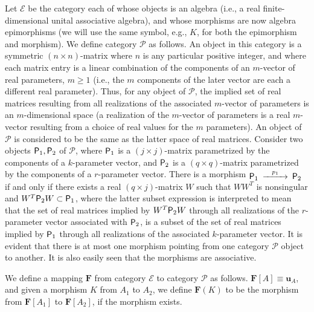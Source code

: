 \documentclass{amsart}
\numberwithin{equation}{section}
\theoremstyle{definition}
\numberwithin{theorem}{section}
\begin{document}
Let $\mathcal{E}$ be the category each of whose objects is an algebra (i.e., a real finite-dimensional unital associative algebra), and whose morphisms are now algebra epimorphisms (we will use the same symbol, e.g., $K$, for both the epimorphism and morphism).  We define category $\mathcal{P}$ as follows. An object in this category is a symmetric $(n\times n)$-matrix where $n$ is any particular positive integer, and where each matrix entry is a linear combination of the components of an $m$-vector of real parameters, $m\ge 1$ (i.e., the $m$ components of the later vector are each a different real parameter).  Thus, for any object of $\mathcal{P}$, the implied set of real matrices resulting from all realizations of the associated $m$-vector of parameters is an $m$-dimensional space (a realization of the $m$-vector of parameters is a real $m$-vector resulting from a choice of real values for the $m$ parameters).  An object of $\mathcal{P}$ is considered to be the same as the latter space of real matrices.  Consider two objects ${\sf P}_1,{\sf P}_2$ of $\mathcal{P}$, where ${\sf P}_1$ is a $(j\times j)$-matrix parametrized by the components of a $k$-parameter vector, and ${\sf P}_2$ is a $(q\times q)$-matrix parametrized by the components of a $r$-parameter vector.  There is a morphism $ \begin{CD}  {\sf P}_1 @>p_1>> {\sf P}_2\end{CD}$ if and only if  there exists a real $(q\times j)$-matrix $W$ such that $WW^T$ is nonsingular and $W^T{\sf P}_2W\subset {\sf P}_1$, where the latter subset expression is 
interpreted to mean that the set of real matrices implied by $W^T{\sf P}_2W$ through all realizations of the $r$-parameter vector associated with ${\sf P}_2$, is a subset of  the set of real matrices implied by  ${\sf P}_1$ through all realizations of the associated $k$-parameter vector.  It is evident that there is at most one morphism pointing from one category $\mathcal{P}$ object to another.  It is also easily seen that the morphisms are associative.  

We define a mapping $\mathbf{F}$ from category $\mathcal{E}$ to category $\mathcal{P}$ as follows.  $\mathbf{F}[
A] \equiv \mathbf{u}_A$, and given a morphism $K$ from $A_1$ to $A_2$, we define $\mathbf{F}(K)$ to be the morphism from $\mathbf{F}[A_1]$ to $\mathbf{F}[A_2]$, if the morphism exists.  
 
\end{document}
